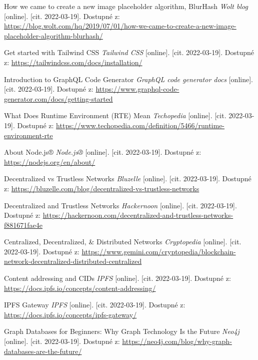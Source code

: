 \begin{thebibliography}{55}
    How we came to create a new image placeholder algorithm, BlurHash \textit{Wolt blog} [online]. [cit. 2022-03-19]. Dostupné z: \url{https://blog.wolt.com/hq/2019/07/01/how-we-came-to-create-a-new-image-placeholder-algorithm-blurhash/}
    
    Get started with Tailwind CSS \textit{Tailwind CSS} [online]. [cit. 2022-03-19]. Dostupné z: \url{https://tailwindcss.com/docs/installation/}
        
    Introduction to GraphQL Code Generator \textit{GraphQL code generator docs} [online]. [cit. 2022-03-19]. Dostupné z: \url{https://www.graphql-code-generator.com/docs/getting-started}
            
    What Does Runtime Environment (RTE) Mean \textit{Techopedia} [online]. [cit. 2022-03-19]. Dostupné z: \url{https://www.techopedia.com/definition/5466/runtime-environment-rte}
    
                
    About Node.js® \textit{Node.js®} [online]. [cit. 2022-03-19]. Dostupné z: \url{https://nodejs.org/en/about/}
    
                    
    Decentralized vs Trustless Networks \textit{Bluzelle} [online]. [cit. 2022-03-19]. Dostupné z: \url{https://bluzelle.com/blog/decentralized-vs-trustless-networks}

    Decentralized and Trustless Networks \textit{Hackernoon} [online]. [cit. 2022-03-19]. Dostupné z: \url{https://hackernoon.com/decentralized-and-trustless-networks-f881671fae4e}
    
    Centralized, Decentralized, \& Distributed Networks \textit{Cryptopedia} [online]. [cit. 2022-03-19]. Dostupné z: \url{https://www.gemini.com/cryptopedia/blockchain-network-decentralized-distributed-centralized}
    
        
    Content addressing and CIDs \textit{IPFS} [online]. [cit. 2022-03-19]. Dostupné z: \url{https://docs.ipfs.io/concepts/content-addressing/}
             
    IPFS Gateway \textit{IPFS} [online]. [cit. 2022-03-19]. Dostupné z: \url{https://docs.ipfs.io/concepts/ipfs-gateway/}
    
    Graph Databases for Beginners: Why Graph Technology Is the Future \textit{Neo4j} [online]. [cit. 2022-03-19]. Dostupné z: \url{https://neo4j.com/blog/why-graph-databases-are-the-future/}
     

\end{thebibliography}
